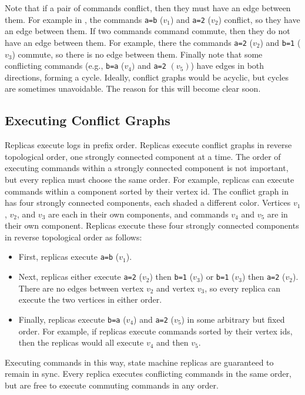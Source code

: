

Note that if a pair of commands conflict, then they must have an edge between
them.  For example in , the commands \texttt{a=b} ($v_1$)
and \texttt{a=2} ($v_2$) conflict, so they have an edge between them. If two
commands command commute, then they do not have an edge between them. For
example, there the commands \texttt{a=2} ($v_2$) and \texttt{b=1} ($v_3$)
commute, so there is no edge between them. Finally note that some conflicting
commands (e.g., \texttt{b=a} ($v_4)$ and \texttt{a=2} $(v_5)$) have edges in
both directions, forming a cycle. Ideally, conflict graphs would be acyclic,
but cycles are sometimes unavoidable. The reason for this will become clear
soon.

\subsection{Executing Conflict Graphs}
Replicas execute logs in prefix order. Replicas execute conflict graphs in
reverse topological order, one strongly connected component at a time.  The
order of executing commands within a strongly connected component is not
important, but every replica must choose the same order. For example, replicas
can execute commands within a component sorted by their vertex id.
%
The conflict graph in  has four strongly connected
components, each shaded a different color. Vertices $v_1$, $v_2$, and $v_3$ are
each in their own components, and commands $v_4$ and $v_5$ are in their own
component. Replicas execute these four strongly connected components in reverse
topological order as follows:
\begin{itemize}
  \item
    First, replicas execute \texttt{a=b} ($v_1$).

  \item
    Next, replicas either execute \texttt{a=2} ($v_2$) then \texttt{b=1}
    ($v_3$) or \texttt{b=1} ($v_3$) then \texttt{a=2} ($v_2$). There are no
    edges between vertex $v_2$ and vertex $v_3$, so every replica can execute
    the two vertices in either order.

  \item
    Finally, replicas execute \texttt{b=a} ($v_4$) and \texttt{a=2} ($v_5$) in
    some arbitrary but fixed order. For example, if replicas execute commands
    sorted by their vertex ids, then the replicas would all execute $v_4$ and
    then $v_5$.
\end{itemize}
Executing commands in this way, state machine replicas are guaranteed to remain
in sync. Every replica executes conflicting commands in the same order, but are
free to execute commuting commands in any order.

